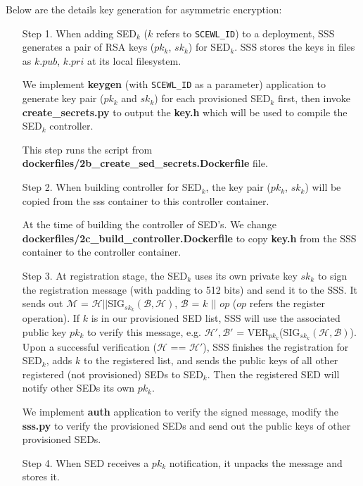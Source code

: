 \documentclass[11pt,oneside,onecolumn,letterpaper]{article}
\begin{document}
Below are the details key generation for asymmetric encryption:
\begin{itemize}
  \item[Step 1.] When adding SED$_k$ ($k$ refers to \verb|SCEWL_ID|) to a deployment, SSS generates a pair of RSA keys ($pk_k$, $sk_k$) for SED$_k$.
  SSS stores the keys in files as $k.pub$, $k.pri$ at its local filesystem.
  
  We implement \textbf{keygen} (with \verb|SCEWL_ID| as a parameter) application to generate key pair ($pk_k$ and $sk_k$) for each provisioned SED$_k$ first, then invoke \textbf{create\_secrets.py} to output the \textbf{key.h} which will be used to compile the SED$_k$ controller.

  This step runs the script from \textbf{dockerfiles/2b\_create\_sed\_secrets.Dockerfile} file.

  \item[Step 2.] When building controller for SED$_k$, the key pair ($pk_k$, $sk_k$) will be copied from the sss container to this controller container.
  
  At the time of building the controller of SED's.
  We change \textbf{dockerfiles/2c\_build\_controller.Dockerfile} to copy \textbf{key.h} from the SSS container to the controller container.

  \item[Step 3.] At registration stage, the SED$_k$ uses its own private key $sk_k$ to sign the registration message (with padding to 512 bits) and send it to the SSS.
  It sends out $\mathcal{M}$ = $\mathcal{H} || $SIG$_{sk_k}(\mathcal{B}, \mathcal{H})$, $\mathcal{B}$ = $k$ $||$ $op$ ($op$ refers the register operation).
  If $k$ is in our provisioned SED list, SSS will use the associated public key $pk_k$ to verify this message, e.g. $\mathcal{H'}, \mathcal{B'}$ = VER$_{pk_k}$(SIG$_{sk_k}(\mathcal{H}, \mathcal{B})$).
  Upon a successful verification ($\mathcal{H}$ == $\mathcal{H'}$), SSS finishes the registration for SED$_k$, adds $k$ to the registered list, and sends the public keys of all other registered (not provisioned) SEDs to SED$_k$. Then the registered SED will notify other SEDs its own $pk_k$.
  
  We implement \textbf{auth} application to verify the signed message, modify the \textbf{sss.py} to verify the provisioned SEDs and send out the public keys of other provisioned SEDs.

  \item[Step 4.] When SED receives a $pk_k$ notification, it unpacks the message and stores it.
   

\end{itemize}
\end{document}
